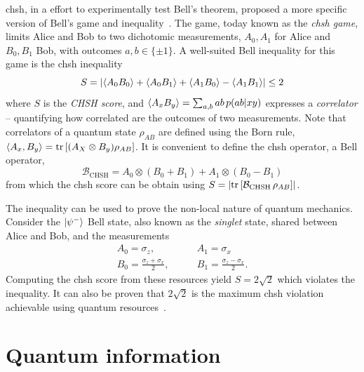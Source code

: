\acrfull{chsh}, in a effort to experimentally test Bell's theorem, proposed a more specific version of Bell's game and inequality~\cite{Clauser1969}.
The game, today known as the \textit{\acrshort{chsh} game}, limits Alice and Bob to two dichotomic measurements, $A_0,A_1$ for Alice and $B_0,B_1$ Bob, with outcomes $a,b\in\{\pm 1\}$. 
A well-suited Bell inequality for this game is the \acrshort{chsh} inequality 
\begin{equation}
	S = \left | \langle {A_0 B_0} \rangle + \langle {A_0 B_1} \rangle + \langle {A_1 B_0} \rangle - \langle {A_1 B_1} \rangle  \right | \leq 2
	\label{eq:CHSH}
\end{equation}
where $S$ is the \textit{CHSH score}, and $\langle {A_x B_y} \rangle = \sum_{a,b} ab\,p(ab|xy)$ expresses a \textit{correlator} -- quantifying how correlated are the outcomes of two measurements.
Note that correlators of a quantum state $\rho_{AB}$ are defined using the Born rule, $\mean{A_x,B_y} = \trr{(A_X \otimes B_y)\rho_{AB}}$.
It is convenient to define the \acrshort{chsh} operator, a Bell operator,
\begin{equation}
	\mathcal{B}_{\mathrm{CHSH}} = A_0 \otimes \left( B_0 + B_1 \right) + A_1 \otimes \left( B_0 - B_1 \right)
	\label{eq:CHSH_operator}
\end{equation}
from which the \acrshort{chsh} score can be obtain using $S = \left| \trr{\mathcal{B}_\mathrm{CHSH}\, \rho_{AB} } \right|$.

\medbreak

The inequality  can be used to prove the non-local nature of quantum mechanics. 
Consider the $\ket{\psi^-}$ Bell state, also known as the \textit{singlet} state, shared between Alice and Bob, and the measurements
\begin{equation}
	\begin{split}
		A_0 = \sigma_z, \quad & \quad A_1 = \sigma_x \\
		B_0 = \frac{\sigma_z+\sigma_x}{2}, \quad &\quad B_1 = \frac{\sigma_z - \sigma_x}{2}.
		\label{eq:CHSH_measurement}
	\end{split}
\end{equation}
Computing the \acrshort{chsh} score from these resources yield $S=2\sqrt{2}$ which violates the inequality.
It can also be proven that $2\sqrt{2}$ is the maximum \acrshort{chsh} violation achievable using quantum resources~\cite{Tsirelson1980}.

\chapter{Quantum information}
\label{chapter:quantumInfo}

